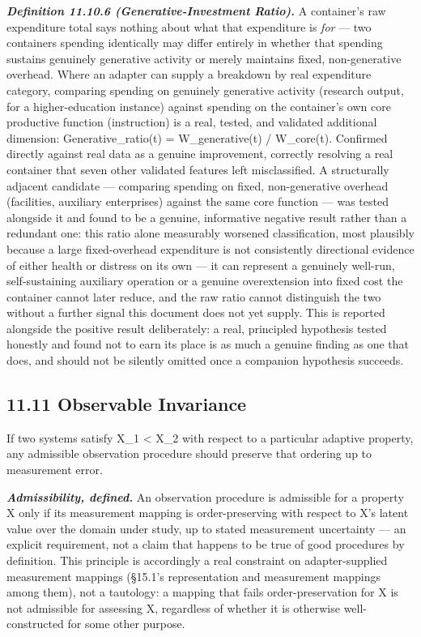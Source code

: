 \documentclass[
]{article}
\begin{document}
\emph{\textbf{Definition 11.10.6 (Generative-Investment Ratio).}} A
container's raw expenditure total says nothing about what that
expenditure is \emph{for} --- two containers spending identically may
differ entirely in whether that spending sustains genuinely generative
activity or merely maintains fixed, non-generative overhead. Where an
adapter can supply a breakdown by real expenditure category, comparing
spending on genuinely generative activity (research output, for a
higher-education instance) against spending on the container's own core
productive function (instruction) is a real, tested, and validated
additional dimension: Generative\_ratio(t) = W\_generative(t) /
W\_core(t). Confirmed directly against real data as a genuine
improvement, correctly resolving a real container that seven other
validated features left misclassified. A structurally adjacent candidate
--- comparing spending on fixed, non-generative overhead (facilities,
auxiliary enterprises) against the same core function --- was tested
alongside it and found to be a genuine, informative negative result
rather than a redundant one: this ratio alone measurably worsened
classification, most plausibly because a large fixed-overhead
expenditure is not consistently directional evidence of either health or
distress on its own --- it can represent a genuinely well-run,
self-sustaining auxiliary operation or a genuine overextension into
fixed cost the container cannot later reduce, and the raw ratio cannot
distinguish the two without a further signal this document does not yet
supply. This is reported alongside the positive result deliberately: a
real, principled hypothesis tested honestly and found not to earn its
place is as much a genuine finding as one that does, and should not be
silently omitted once a companion hypothesis succeeds.

\hypertarget{observable-invariance}{%
\subsection{11.11 Observable Invariance}\label{observable-invariance}}

If two systems satisfy X\_1 \textless{} X\_2 with respect to a
particular adaptive property, any admissible observation procedure
should preserve that ordering up to measurement error.

\emph{\textbf{Admissibility, defined.}} An observation procedure is
admissible for a property X only if its measurement mapping is
order-preserving with respect to X's latent value over the domain under
study, up to stated measurement uncertainty --- an explicit requirement,
not a claim that happens to be true of good procedures by definition.
This principle is accordingly a real constraint on adapter-supplied
measurement mappings (§15.1's representation and measurement mappings
among them), not a tautology: a mapping that fails order-preservation
for X is not admissible for assessing X, regardless of whether it is
otherwise well-constructed for some other purpose.
\end{document}
